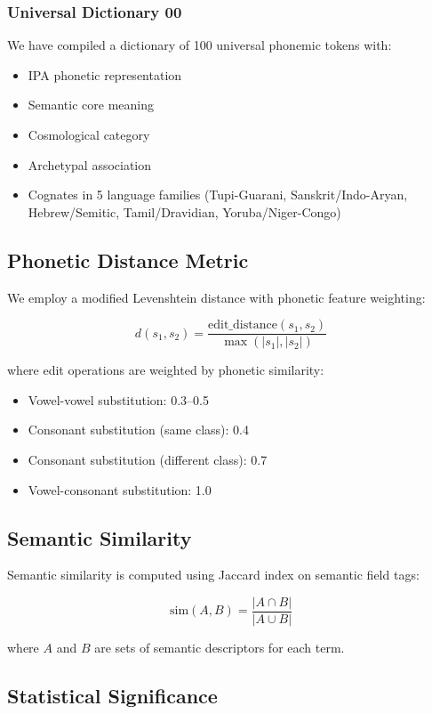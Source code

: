 \documentclass[12pt,a4paper]{article}
\begin{document}
\subsubsection{Universal Dictionary 00}
We have compiled a dictionary of 100 universal phonemic tokens with:
\begin{itemize}
    \item IPA phonetic representation
    \item Semantic core meaning
    \item Cosmological category
    \item Archetypal association
    \item Cognates in 5 language families (Tupi-Guarani, Sanskrit/Indo-Aryan, Hebrew/Semitic, Tamil/Dravidian, Yoruba/Niger-Congo)
\end{itemize}

\subsection{Phonetic Distance Metric}

We employ a modified Levenshtein distance with phonetic feature weighting:

\[
d(s_1, s_2) = \frac{\text{edit\_distance}(s_1, s_2)}{\max(|s_1|, |s_2|)}
\]

where edit operations are weighted by phonetic similarity:
\begin{itemize}
    \item Vowel-vowel substitution: 0.3--0.5
    \item Consonant substitution (same class): 0.4
    \item Consonant substitution (different class): 0.7
    \item Vowel-consonant substitution: 1.0
\end{itemize}

\subsection{Semantic Similarity}

Semantic similarity is computed using Jaccard index on semantic field tags:

\[
\text{sim}(A, B) = \frac{|A \cap B|}{|A \cup B|}
\]

where $A$ and $B$ are sets of semantic descriptors for each term.

\subsection{Statistical Significance}
\end{document}
